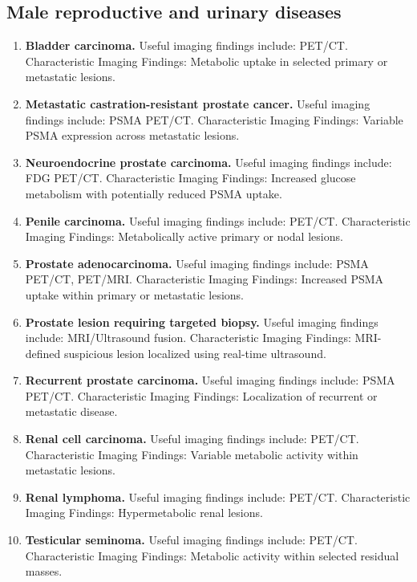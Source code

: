 \subsection{Male reproductive and urinary diseases}
\begin{enumerate}[leftmargin=*,itemsep=0.45em,topsep=0.4em]
\item \textbf{Bladder carcinoma.} Useful imaging findings include: PET/CT. Characteristic Imaging Findings: Metabolic uptake in selected primary or metastatic lesions.
\item \textbf{Metastatic castration-resistant prostate cancer.} Useful imaging findings include: PSMA PET/CT. Characteristic Imaging Findings: Variable PSMA expression across metastatic lesions.
\item \textbf{Neuroendocrine prostate carcinoma.} Useful imaging findings include: FDG PET/CT. Characteristic Imaging Findings: Increased glucose metabolism with potentially reduced PSMA uptake.
\item \textbf{Penile carcinoma.} Useful imaging findings include: PET/CT. Characteristic Imaging Findings: Metabolically active primary or nodal lesions.
\item \textbf{Prostate adenocarcinoma.} Useful imaging findings include: PSMA PET/CT, PET/MRI. Characteristic Imaging Findings: Increased PSMA uptake within primary or metastatic lesions.
\item \textbf{Prostate lesion requiring targeted biopsy.} Useful imaging findings include: MRI/Ultrasound fusion. Characteristic Imaging Findings: MRI-defined suspicious lesion localized using real-time ultrasound.
\item \textbf{Recurrent prostate carcinoma.} Useful imaging findings include: PSMA PET/CT. Characteristic Imaging Findings: Localization of recurrent or metastatic disease.
\item \textbf{Renal cell carcinoma.} Useful imaging findings include: PET/CT. Characteristic Imaging Findings: Variable metabolic activity within metastatic lesions.
\item \textbf{Renal lymphoma.} Useful imaging findings include: PET/CT. Characteristic Imaging Findings: Hypermetabolic renal lesions.
\item \textbf{Testicular seminoma.} Useful imaging findings include: PET/CT. Characteristic Imaging Findings: Metabolic activity within selected residual masses.
\end{enumerate}

